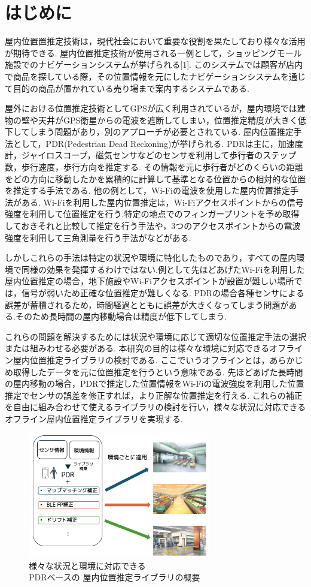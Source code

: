 
\section{はじめに}
屋内位置置推定技術は，現代社会において重要な役割を果たしており様々な活用が期待できる.
屋内位置推定技術が使用される一例として，ショッピングモール施設でのナビゲーションシステムが挙げられる[1].
このシステムでは顧客が店内で商品を探している際，その位置情報を元にしたナビゲーションシステムを通じて目的の商品が置かれている売り場まで案内するシステムである.

屋外における位置推定技術としてGPSが広く利用されているが，屋内環境では建物の壁や天井がGPS衛星からの電波を遮断してしまい，位置推定精度が大きく低下してしまう問題があり，別のアプローチが必要とされている.
屋内位置推定手法として，PDR(Pedestrian Dead Reckoning)が挙げられる.
PDRは主に，加速度計，ジャイロスコープ，磁気センサなどのセンサを利用して歩行者のステップ数，歩行速度，歩行方向を推定する.
その情報を元に歩行者がどのくらいの距離をどの方向に移動したかを累積的に計算して基準となる位置からの相対的な位置を推定する手法である.
他の例として，Wi-Fiの電波を使用した屋内位置推定手法がある.
Wi-Fiを利用した屋内位置推定は，Wi-Fiアクセスポイントからの信号強度を利用して位置推定を行う.特定の地点でのフィンガープリントを予め取得しておきそれと比較して推定を行う手法や，3つのアクセスポイントからの電波強度を利用して三角測量を行う手法がなどがある.

しかしこれらの手法は特定の状況や環境に特化したものであり，すべての屋内環境で同様の効果を発揮するわけではない.例として先ほどあげたWi-Fiを利用した屋内位置推定の場合，地下施設やWi-Fiアクセスポイントが設置が難しい場所では，信号が弱いため正確な位置推定が難しくなる.
PDRの場合各種センサによる誤差が蓄積されるため，時間経過とともに誤差が大きくなってしまう問題がある.そのため長時間の屋内移動場合は精度が低下してしまう.

これらの問題を解決するためには状況や環境に応じて適切な位置推定手法の選択または組みわせる必要がある.
本研究の目的は様々な環境に対応できるオフライン屋内位置推定ライブラリの検討である.
ここでいうオフラインとは，あらかじめ取得したデータを元に位置推定を行うという意味である.
先ほどあげた長時間の屋内移動の場合，PDRで推定した位置情報をWi-Fiの電波強度を利用した位置推定でセンサの誤差を修正すれば，より正解な位置推定を行える.
これらの補正を自由に組み合わせて使えるライブラリの検討を行い，様々な状況に対応できるオフライン屋内位置推定ライブラリを実現する.

\begin{figure}[h]
	\centering
	\includegraphics[width=80mm]{image/first.png}
	\caption{様々な状況と環境に対応できる\\PDRベースの
		屋内位置推定ライブラリの概要}    \label{fig:gt-trajectory}
\end{figure}
